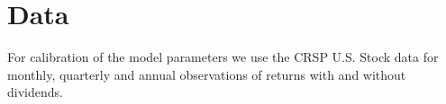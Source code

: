 \section{Data} \label{sec:Data}

For calibration of the model parameters we use the CRSP U.S. Stock data for monthly, quarterly and annual observations of returns with and without dividends. 
